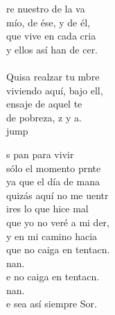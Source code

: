 \begin{cancion}%
	re nuestro de la va\\
	mío, de ése, y de él,\\
	que vive en cada cria\\
	y ellos así han de cer.\\
	\jump\\
	Quisa realzar tu mbre\\
	viviendo aquí, bajo ell,\\
	ensaje de aquel te\\
	de pobreza, z y a.\\jump\\
	\begin{chorus}%
	s pan para vivir\\
	sólo el momento prnte\\
	ya que el día de mana \\
	quizás aquí no me uentr\\
	ires lo que hice mal\\
	que yo no veré a mi der,\\
	y en mi camino hacia \\
	que no caiga en tentacn.\\
	nan.\\
	e no caiga en tentacn.\\
	nan.\\
	e sea así siempre Sor.\\
	\end{chorus}%
	\jump\\
\end{cancion}%
